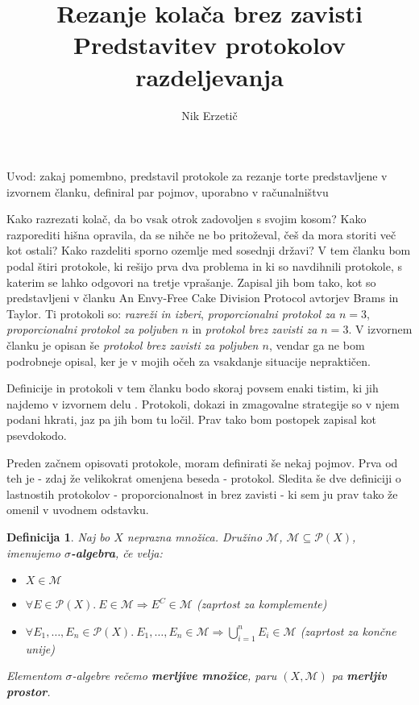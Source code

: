 \documentclass[a4paper, 12pt]{article}
\title{
	\textbf{Rezanje kolača brez zavisti} \\
	\large Predstavitev protokolov razdeljevanja 
}
\author{Nik Erzetič}
\newtheorem{definicija}{Definicija}
\begin{document}
	
	\maketitle
	
	Uvod: zakaj pomembno, predstavil protokole za rezanje torte predstavljene v izvornem članku, definiral par pojmov, uporabno v računalništvu
	
	Kako razrezati kolač, da bo vsak otrok zadovoljen s svojim kosom? Kako razporediti hišna opravila, da se nihče ne bo pritoževal, češ da mora storiti več kot ostali? Kako razdeliti sporno ozemlje med sosednji državi? V tem članku bom podal štiri protokole, ki rešijo prva dva problema in ki so navdihnili protokole, s katerim se lahko odgovori na tretje vprašanje. Zapisal jih bom tako, kot so predstavljeni v članku An Envy-Free Cake Division Protocol \cite{brams-taylor} avtorjev Brams in Taylor. Ti protokoli so: \textit{razreži in izberi}, \textit{proporcionalni protokol za $n = 3$}, \textit{proporcionalni protokol za poljuben $n$} in \textit{protokol brez zavisti za $n = 3$}. V izvornem članku je opisan še \textit{protokol brez zavisti za poljuben $n$}, vendar ga ne bom podrobneje opisal, ker je v mojih očeh za vsakdanje situacije nepraktičen.
	
	Definicije in protokoli v tem članku bodo skoraj povsem enaki tistim, ki jih najdemo v izvornem delu \cite{brams-taylor}. Protokoli, dokazi in zmagovalne strategije so v njem podani hkrati, jaz pa jih bom tu ločil. Prav tako bom postopek zapisal kot psevdokodo.
	
	Preden začnem opisovati protokole, moram definirati še nekaj pojmov. Prva od teh je - zdaj že velikokrat omenjena beseda - protokol. Sledita še dve definiciji o lastnostih protokolov - proporcionalnost in brez zavisti - ki sem ju prav tako že omenil v uvodnem odstavku.
	
	\begin{definicija}
		Naj bo $X$ neprazna množica. Družino $\mathcal{M}$, $\mathcal{M} \subseteq \mathcal{P}(X)$, imenujemo \textbf{$\sigma$-algebra}, če velja:
		\begin{itemize}
			\item $X \in \mathcal{M}$
			
			\item $\forall E \in \mathcal{P}(X).\ E \in \mathcal{M} \Rightarrow E^C \in \mathcal{M}$ (zaprtost za komplemente)
			
			\item $\forall E_1, \ldots, E_n \in \mathcal{P}(X).\ E_1, \ldots, E_n \in \mathcal{M} \Rightarrow \bigcup_{i=1}^{n} E_i \in \mathcal{M}$ (zaprtost za končne unije)
		\end{itemize}
		Elementom $\sigma$-algebre rečemo \textbf{merljive množice}, paru $(X, \mathcal{M})$ pa \textbf{merljiv prostor}.
	\end{definicija}
\end{document}
